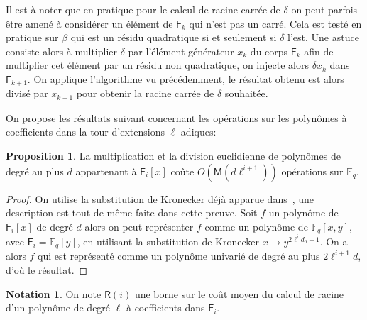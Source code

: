 \documentclass[10pt,a4paper]{book}
\theoremstyle{plain}
\theoremstyle{definition}
\theoremstyle{definition}
\theoremstyle{definition}
\theoremstyle{definition}
\newtheorem{prop}[thm]{Proposition}
\theoremstyle{definition}
\theoremstyle{remark}
\theoremstyle{remark}
\theoremstyle{definition}
\newtheorem{nota}[thm]{Notation}
\begin{document}
Il est à noter que en pratique pour le calcul de racine carrée de $\delta$ on peut parfois être amené à considérer un élément de $\mathsf{F}_k$ qui n'est pas un carré. Cela est testé en pratique sur $\beta$ qui est un résidu quadratique si et seulement si $\delta$ l'est. Une astuce consiste alors à multiplier $\delta$ par l'élément générateur $x_{k}$ du corps $\mathsf{F}_k$ afin  de multiplier cet élément par un résidu non quadratique, on injecte alors $\delta x_k$ dans $\mathsf{F}_{k+1}$. On applique l'algorithme vu précédemment, le résultat obtenu est alors divisé par $x_{k+1}$ pour obtenir la racine carrée de $\delta$ souhaitée.

On propose les résultats suivant concernant les opérations sur les 
polynômes à coefficients dans la tour d'extensions $\ell$-adiques:

\begin{prop}
\label{pro:mult:pol}
La multiplication et la division euclidienne de polynômes de degré au plus $d$ 
appartenant à $\mathsf{F}_i[x]$ coûte $O(\mathsf{M}(d\ell^{i+1}))$ opérations sur 
$\mathbb{F}_q$.
\end{prop}

\begin{proof}
On utilise la substitution de Kronecker déjà apparue 
dans~\cite[Lemma 2.2]{vzGShoup92}, une description est tout de même faite dans 
cette preuve. Soit $f$ un polynôme de $\mathsf{F}_{i}[x]$ de degré $d$ alors on 
peut représenter $f$ comme un polynôme de $\mathbb{F}_q[x,y]$, avec 
$\mathsf{F}_i=\mathbb{F}_q[y]$, en utilisant la substitution de 
Kronecker $x \rightarrow y^{2\ell^{i}d_0-1}$. On a alors $f$ qui est représenté
 comme un polynôme univarié de degré au plus $2\ell^{i+1} d$, d'où le résultat.
\end{proof}

\begin{nota}
\label{not:cout:R}
On note $\mathsf{R}(i)$ une borne sur le coût moyen du calcul de racine d'un polynôme de degré $\ell$ à coefficients dans $\mathsf{F}_i$.
\end{nota}
\end{document}
